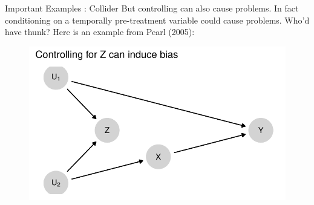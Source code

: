\documentclass[
  11pt,
  ignorenonframetext,
]{beamer}
\begin{document}
\begin{frame}{Important Examples : Collider}
\protect\hypertarget{important-examples-collider}{}
But controlling can also cause problems. In fact conditioning on a
temporally pre-treatment variable could cause problems. Who'd have
thunk? Here is an example from Pearl (2005):

\begin{figure}

{\centering \includegraphics{2.2_estimands_files/figure-beamer/unnamed-chunk-13-1.pdf}

}

\end{figure}
\end{frame}
\end{document}
